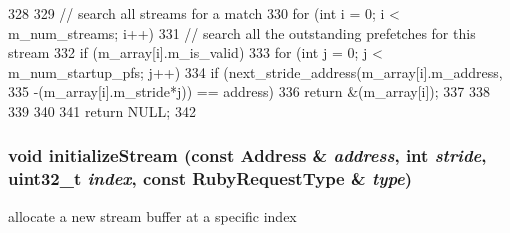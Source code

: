 \begin{DoxyCode}
328 {
329     // search all streams for a match
330     for (int i = 0; i < m_num_streams; i++) {
331         // search all the outstanding prefetches for this stream
332         if (m_array[i].m_is_valid) {
333             for (int j = 0; j < m_num_startup_pfs; j++) {
334                 if (next_stride_address(m_array[i].m_address,
335                     -(m_array[i].m_stride*j)) == address) {
336                     return &(m_array[i]);
337                 }
338             }
339         }
340     }
341     return NULL;
342 }
\end{DoxyCode}
\hypertarget{classPrefetcher_a5125f46f95961714c0ebdf658b6bb745}{
\subsubsection[{initializeStream}]{\setlength{\rightskip}{0pt plus 5cm}void initializeStream (const {\bf Address} \& {\em address}, \/  int {\em stride}, \/  {\bf uint32\_\-t} {\em index}, \/  const RubyRequestType \& {\em type})}}
\label{classPrefetcher_a5125f46f95961714c0ebdf658b6bb745}


allocate a new stream buffer at a specific index 


